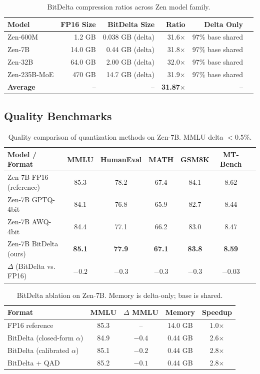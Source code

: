 \documentclass[11pt,a4paper]{article}
\begin{document}
\begin{table}[H]
\centering
\begin{tabular}{lrrrrr}
\toprule
\textbf{Model} & \textbf{FP16 Size} & \textbf{BitDelta Size} & \textbf{Ratio} & \textbf{Delta Only} \\
\midrule
Zen-600M & 1.2 GB & 0.038 GB (delta) & 31.6$\times$ & 97\% base shared \\
Zen-7B & 14.0 GB & 0.44 GB (delta) & 31.8$\times$ & 97\% base shared \\
Zen-32B & 64.0 GB & 2.00 GB (delta) & 32.0$\times$ & 97\% base shared \\
Zen-235B-MoE & 470 GB & 14.7 GB (delta) & 31.9$\times$ & 97\% base shared \\
\midrule
\textbf{Average} & -- & -- & \textbf{31.87$\times$} & -- \\
\bottomrule
\end{tabular}
\caption{BitDelta compression ratios across Zen model family.}
\end{table}

\subsection{Quality Benchmarks}

\begin{table}[H]
\centering
\begin{tabular}{lcccccc}
\toprule
\textbf{Model / Format} & \textbf{MMLU} & \textbf{HumanEval} & \textbf{MATH} & \textbf{GSM8K} & \textbf{MT-Bench} \\
\midrule
Zen-7B FP16 (reference) & 85.3 & 78.2 & 67.4 & 84.1 & 8.62 \\
Zen-7B GPTQ-4bit & 84.1 & 76.8 & 65.9 & 82.7 & 8.44 \\
Zen-7B AWQ-4bit & 84.4 & 77.1 & 66.2 & 83.0 & 8.47 \\
Zen-7B BitDelta (ours) & \textbf{85.1} & \textbf{77.9} & \textbf{67.1} & \textbf{83.8} & \textbf{8.59} \\
\midrule
$\Delta$ (BitDelta vs. FP16) & $-0.2$ & $-0.3$ & $-0.3$ & $-0.3$ & $-0.03$ \\
\bottomrule
\end{tabular}
\caption{Quality comparison of quantization methods on Zen-7B. MMLU delta $< 0.5\%$.}
\end{table}

\begin{table}[H]
\centering
\begin{tabular}{lcccc}
\toprule
\textbf{Format} & \textbf{MMLU} & \textbf{$\Delta$ MMLU} & \textbf{Memory} & \textbf{Speedup} \\
\midrule
FP16 reference & 85.3 & -- & 14.0 GB & 1.0$\times$ \\
BitDelta (closed-form $\alpha$) & 84.9 & $-0.4$ & 0.44 GB & 2.6$\times$ \\
BitDelta (calibrated $\alpha$) & 85.1 & $-0.2$ & 0.44 GB & 2.8$\times$ \\
BitDelta + QAD & 85.2 & $-0.1$ & 0.44 GB & 2.8$\times$ \\
\bottomrule
\end{tabular}
\caption{BitDelta ablation on Zen-7B. Memory is delta-only; base is shared.}
\end{table}
\end{document}
